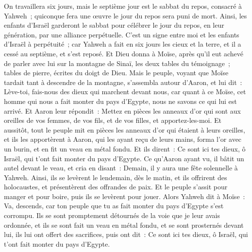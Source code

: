\begin{multicols}{2}
On travaillera six jours, mais le septième jour est le sabbat du repos, consacré à Yahweh~; quiconque fera une œuvre le jour du repos sera puni de mort.
Ainsi, les enfants d'Israël garderont le sabbat pour célébrer le jour du repos, en leur génération, par une alliance perpétuelle.
C'est un signe entre moi et les enfants d'Israël à perpétuité~; car Yahweh a fait en six jours les cieux et la terre, et il a cessé au septième, et s'est reposé.
Et Dieu donna à Moïse, après qu'il eut achevé de parler avec lui sur la montagne de Sinaï, les deux tables du témoignage~; tables de pierre, écrites du doigt de Dieu.
\VerseOne{}Mais le peuple, voyant que Moïse tardait tant à descendre de la montagne, s'assembla autour d'Aaron, et lui dit~: Lève-toi, fais-nous des dieux qui marchent devant nous, car quant à ce Moïse, cet homme qui nous a fait monter du pays d'Egypte, nous ne savons ce qui lui est arrivé.
Et Aaron leur répondit~: Mettez en pièces les anneaux d'or qui sont aux oreilles de vos femmes, de vos fils, et de vos filles, et apportez-les-moi.
 Et aussitôt, tout le peuple mit en pièces les anneaux d'or qui étaient à leurs oreilles, et ils les apportèrent à Aaron,
qui les ayant reçu de leurs mains, forma l'or avec un burin, et en fit un veau en métal fondu. Et ils dirent~: Ce sont ici tes dieux, ô Israël, qui t'ont fait monter du pays d'Egypte.
Ce qu'Aaron ayant vu, il bâtit un autel devant le veau, et cria en disant~: Demain, il y aura une fête solennelle à Yahweh.
Ainsi, ils se levèrent le lendemain, dès le matin, et ils offrirent des holocaustes, et présentèrent des offrandes de paix. Et le peuple s'assit pour manger et pour boire, puis ils se levèrent pour jouer.
Alors Yahweh dit à Moïse~: Va, descends, car ton peuple que tu as fait monter du pays d'Egypte s'est corrompu.
Ils se sont promptement détournés de la voie que je leur avais ordonnée, et ils se sont fait un veau en métal fondu, et se sont prosternés devant lui, ils lui ont offert des sacrifices, puis ont dit~: Ce sont ici tes dieux, ô Israël, qui t'ont fait monter du pays d'Egypte.

\end{multicols}
